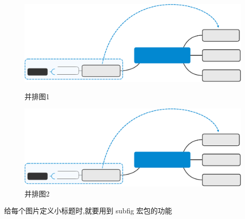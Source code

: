 \documentclass[a4paper]{ctexart}
\begin{document}
    \begin{figure}[htbp]
        \centering
        \begin{minipage}[b][120pt][t]{0.45\linewidth}
            \centering
            \includegraphics[scale=0.25]{Central_Topic.eps}
            \caption{并排图1}
        \end{minipage}
        \qquad
        \begin{minipage}[b][120pt][t]{0.45\linewidth}
            \centering
            \includegraphics[scale=0.25]{Central_Topic.eps}
            \caption{并排图2}
        \end{minipage}
    \end{figure}     
    给每个图片定义小标题时,就要用到 subfig 宏包的功能    
\end{document}
